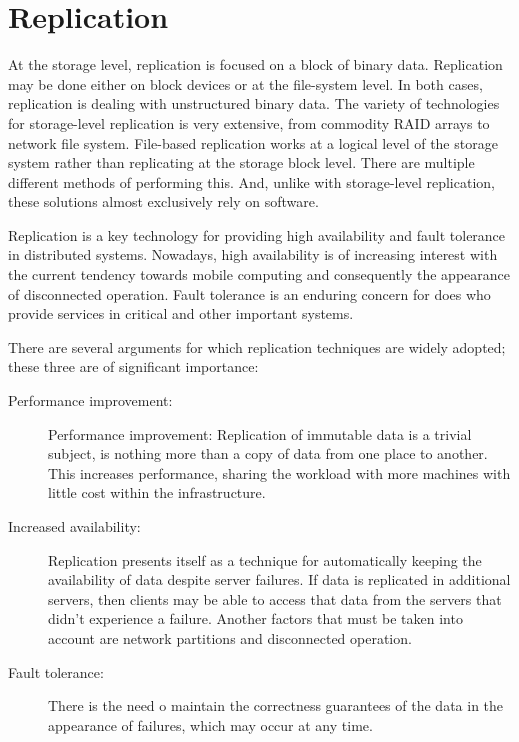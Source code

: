\section{Replication}
\label{sec:replication}


At the storage level, replication is focused on a block of binary data. Replication may be done either on block devices or at the file-system level. In both cases, replication is dealing with unstructured binary data. The variety of technologies for storage-level replication is very extensive, from commodity RAID arrays to network file system.
File-based replication works at a logical level of the storage system rather than replicating at the storage block level. There are multiple different methods of performing this. And, unlike with storage-level replication, these solutions almost exclusively rely on software.

Replication is a key technology for providing high availability and fault tolerance in distributed systems. Nowadays, high availability is of increasing interest with the current tendency towards mobile computing and consequently the appearance of disconnected operation. Fault tolerance is an enduring concern for does who provide services in critical and other important systems.

There are several arguments for which replication techniques are widely adopted; these three are of significant importance:

\begin{description}
	\item [Performance improvement:] Performance improvement: Replication of immutable data is a trivial subject, is nothing more than a copy of data from one place to another. This increases performance, sharing the workload with more machines with little cost within the infrastructure.
	\item [Increased availability:] Replication presents itself as a technique for automatically keeping the availability of data despite server failures. If data is replicated in additional servers, then clients may be able to access that data from the servers that didn't experience a failure.
		Another factors that must be taken into account are network partitions and disconnected operation.
	\item [Fault tolerance:] There is the need o maintain the correctness guarantees of the data in the appearance of failures, which may occur at any time.
\end{description}





 
